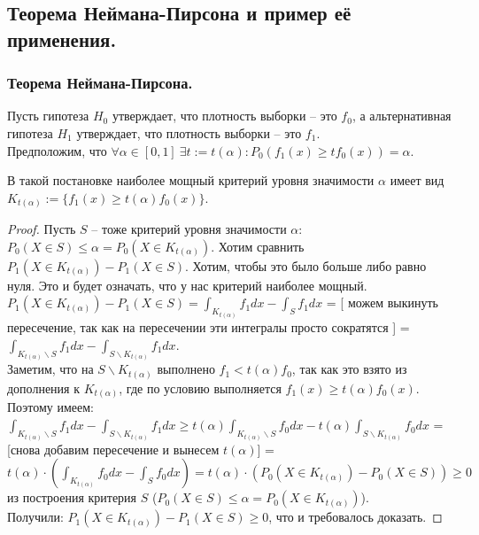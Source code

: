 \subsection{Теорема Неймана-Пирсона и пример её применения.}

\subsubsection{Теорема Неймана-Пирсона.}
Пусть гипотеза $H_0$ утверждает, что плотность выборки -- это $f_0$, а альтернативная
гипотеза $H_1$ утверждает, что плотность выборки -- это $f_1$. \\
Предположим, что
 $\forall \alpha \in [0, 1] \ \exists t := t(\alpha): P_0(f_1(x) \geqslant tf_0(x)) = \alpha$. 

\begin{theorem*}
     В такой постановке наиболее мощный критерий уровня значимости $\alpha$ имеет вид \\
    $K_{t(\alpha)} := \{ f_1(x) \geqslant t(\alpha)f_0(x)\}$.
\end{theorem*}
\begin{proof}
    Пусть $S$ -- тоже критерий уровня значимости $\alpha$: $P_0(X \in S) \leqslant \alpha = P_0(X \in K_{t(\alpha)})$.
    Хотим сравнить $P_1(X \in K_{t(\alpha)}) - P_1(X \in S)$. Хотим, чтобы это было больше либо равно нуля. Это и будет
    означать, что у нас критерий наиболее мощный. \\
    $\displaystyle P_1(X \in K_{t(\alpha)}) - P_1(X \in S) = \int_{K_{t(\alpha)}}f_1dx - \int_{S}f_1dx$ = [
        можем выкинуть пересечение, так как на пересечении эти интегралы просто сократятся
    ] = $\int_{K_{t(\alpha)}\backslash S}f_1dx - \int_{S\backslash K_{t(\alpha)}}f_1dx$. \\
    Заметим, что на $S\backslash K_{t(\alpha)}$ выполнено $f_1 < t(\alpha)f_0$, так как это взято из
    дополнения к $K_{t(\alpha)}$, где по условию выполняется $ f_1(x) \geqslant t(\alpha)f_0(x)$. Поэтому имеем: 
    $\int_{K_{t(\alpha)}\backslash S}f_1dx - \int_{S\backslash K_{t(\alpha)}}f_1dx \geqslant
    t(\alpha) \int_{K_{t(\alpha)}\backslash S}f_0dx - t(\alpha)\int_{S\backslash K_{t(\alpha)}}f_0dx$ = [снова добавим пересечение
    и вынесем $t(\alpha)$] = $t(\alpha) \cdot (\int_{K_{t(\alpha)}}f_0dx - \int_{S}f_0dx) =
    t(\alpha) \cdot (P_0(X \in K_{t(\alpha)}) - P_0(X \in S)) \geqslant 0$ из построения критерия
     $S$ ($P_0(X \in S) \leqslant \alpha = P_0(X \in K_{t(\alpha)})$). \\
     
    Получили: $P_1(X \in K_{t(\alpha)}) - P_1(X \in S) \geqslant 0$, что и требовалось доказать.
\end{proof}

